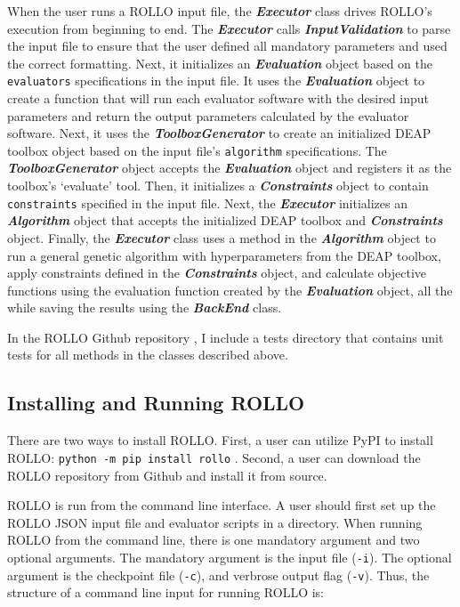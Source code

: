 When the user runs a \gls{ROLLO} input file, the \textbf{\textit{Executor}} class 
drives \gls{ROLLO}'s execution from beginning to end.
The \textbf{\textit{Executor}} calls \textbf{\textit{InputValidation}} to 
parse the input file to ensure that the user defined all mandatory parameters
and used the correct formatting.
Next, it initializes an \textbf{\textit{Evaluation}} object based on the 
\texttt{evaluators} specifications in the input file. 
It uses the \textbf{\textit{Evaluation}} object to create a function that will 
run each evaluator software with the desired input parameters and return the 
output parameters calculated by the evaluator software. 
Next, it uses the \textbf{\textit{ToolboxGenerator}} to create an initialized 
DEAP toolbox object based on the input file's \texttt{algorithm} specifications. 
The \textbf{\textit{ToolboxGenerator}} object accepts the 
\textbf{\textit{Evaluation}} object and registers it as the toolbox's `evaluate' 
tool.  
Then, it initializes a \textbf{\textit{Constraints}} object to contain 
\texttt{constraints} specified in the input file. 
Next, the \textbf{\textit{Executor}} initializes an \textbf{\textit{Algorithm}} 
object that accepts the initialized \gls{DEAP} toolbox and \textbf{\textit{Constraints}} 
object. 
Finally, the \textbf{\textit{Executor}} class uses a method in the 
\textbf{\textit{Algorithm}} object to run a general genetic algorithm with 
hyperparameters from the \gls{DEAP} toolbox, apply constraints defined in the 
\textbf{\textit{Constraints}} object, and calculate objective functions using 
the evaluation function created by the \textbf{\textit{Evaluation}} object, all 
the while saving the results using the \textbf{\textit{BackEnd}} class. 

In the \gls{ROLLO} Github repository \cite{chee_rollo_2021}, I include a tests 
directory that contains unit tests for all methods in the classes described 
above. %

\subsection{Installing and Running ROLLO}
There are two ways to install \gls{ROLLO}.
First, a user can utilize \gls{PyPI} to install \gls{ROLLO}: \texttt{python -m 
pip install rollo}
\cite{chee_rollo_2021}.
Second, a user can download the \gls{ROLLO} repository \cite{chee_rollo_2021}
from Github and install it from source. 

\gls{ROLLO} is run from the command line interface. 
A user should first set up the \gls{ROLLO} JSON input file and evaluator 
scripts in a directory. 
When running \gls{ROLLO} from the command line, there is one mandatory argument and 
two optional arguments. 
The mandatory argument is the input file (\texttt{-i}). 
The optional argument is the checkpoint file (\texttt{-c}), and verbrose 
output flag (\texttt{-v}).  
Thus, the structure of a command line input for running \gls{ROLLO} is: 


